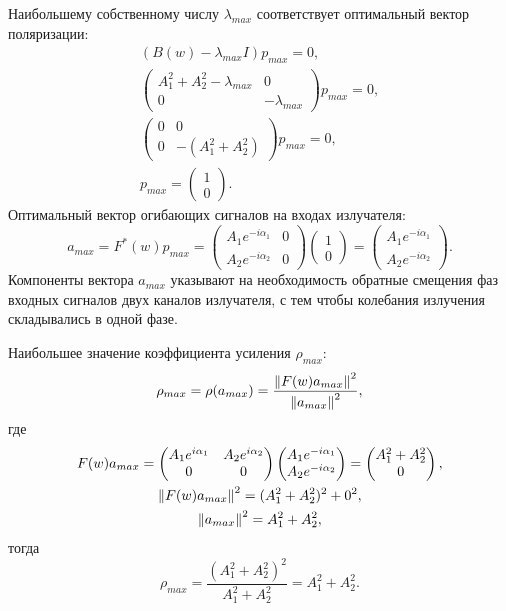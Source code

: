 Наибольшему собственному числу $\lambda_{max}$ соответствует оптимальный вектор поляризации:
\begin{gather*}
    (B(w) - \lambda_{max} I) p_{max} = 0 , \\
    \begin{pmatrix}
        A_1^2 + A_2^2 - \lambda_{max} & 0 \\
        0                             & - \lambda_{max}
    \end{pmatrix}
    p_{max} = 0 , \\
    \begin{pmatrix}
        0 & 0 \\
        0 & - (A_1^2 + A_2^2)
    \end{pmatrix}
    p_{max} = 0 , \\
    p_{max} = \begin{pmatrix}
                  1 \\
                  0
    \end{pmatrix} .
\end{gather*}
Оптимальный вектор огибающих сигналов на входах излучателя:
\[
    a_{max}
    = F^*(w) p_{max}
    = \begin{pmatrix}
          A_1 e^{- i \alpha_1} & 0 \\
          A_2 e^{- i \alpha_2} & 0
    \end{pmatrix}
    \begin{pmatrix}
        1 \\
        0
    \end{pmatrix}
    = \begin{pmatrix}
          A_1 e^{- i \alpha_1} \\
          A_2 e^{- i \alpha_2}
    \end{pmatrix} .
\]
Компоненты вектора $a_{max}$ указывают на необходимость обратные смещения фаз входных сигналов двух каналов излучателя, с тем чтобы колебания
излучения складывались в одной фазе.

Наибольшее значение коэффициента усиления $\rho_{max}$:
\[
    \rho_{max}
    = \rho(a_{max})
    = \frac{\left \| F(w) a_{max} \right \|^2}{\left \| a_{max} \right \|^2} ,
\]
где
\begin{gather*}
    F(w) a_{max}
    = \begin{pmatrix}
          A_1 e^{i \alpha_1} & A_2 e^{i \alpha_2}\\
          0   & 0
    \end{pmatrix}
    \begin{pmatrix}
        A_1 e^{- i \alpha_1} \\
        A_2 e^{- i \alpha_2}
    \end{pmatrix}
    = \begin{pmatrix}
          A_1^2 + A_2^2 \\
          0
    \end{pmatrix} , \\
    \left \| F(w) a_{max} \right \|^2 = (A_1^2 + A_2^2)^2 + 0^2 , \\
    \left \| a_{max} \right \|^2 = A_1^2 + A_2^2 ,
\end{gather*}
тогда
\[
    \rho_{max}
    = \frac{(A_1^2 + A_2^2)^2}{A_1^2 + A_2^2}
    = A_1^2 + A_2^2 .
\]

